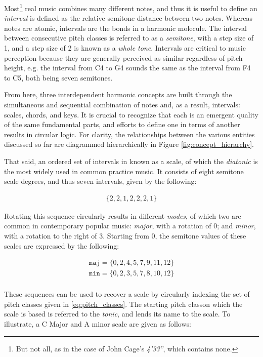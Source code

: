 Most\footnote{But not all, as in the case of John Cage's \emph{4'33''}, which contains none.} real music combines many different notes, and thus it is useful to define an \emph{interval} is defined as the relative semitone distance between two notes.
Whereas notes are atomic, intervals are the bonds in a harmonic molecule.
The interval between consecutive pitch classes is referred to as a \emph{semitone}, with a step size of 1, and a step size of 2 is known as a \emph{whole tone}.
Intervals are critical to music perception because they are generally perceived as similar regardless of pitch height, e.g. the interval from C4 to G4 sounds the same as the interval from F4 to C5, both being seven semitones.

From here, three interdependent harmonic concepts are built through the simultaneous and sequential combination of notes and, as a result, intervals: scales, chords, and keys.
It is crucial to recognize that each is an emergent quality of the same fundamental parts, and efforts to define one in terms of another results in circular logic.
For clarity, the relationships between the various entities discussed so far are diagrammed hierarchically in Figure \ref{fig:concept_hierarchy}.

That said, an ordered set of intervals in known as a scale, of which the \emph{diatonic} is the most widely used in common practice music.
It consists of eight semitone scale degrees, and thus seven intervals, given by the following:

\begin{align*}
\{2, 2, 1, 2, 2, 2, 1\}
\end{align*}

Rotating this sequence circularly results in different \emph{modes}, of which two are common in contemporary popular music: \emph{major}, with a rotation of 0; and \emph{minor}, with a rotation to the right of 3.
Starting from 0, the semitone values of these scales are expressed by the following:

\begin{align*}
\texttt{maj} = \{0, 2, 4, 5, 7, 9, 11, 12\} \\
\texttt{min} = \{0, 2, 3, 5, 7, 8, 10, 12\} \\
\end{align*}

These sequences can be used to recover a scale by circularly indexing the set of pitch classes given in \ref{eq:pitch_classes}.
The starting pitch classon which the scale is based is referred to the \emph{tonic}, and lends its name to the scale.
To illustrate, a C Major and A minor scale are given as follows:

